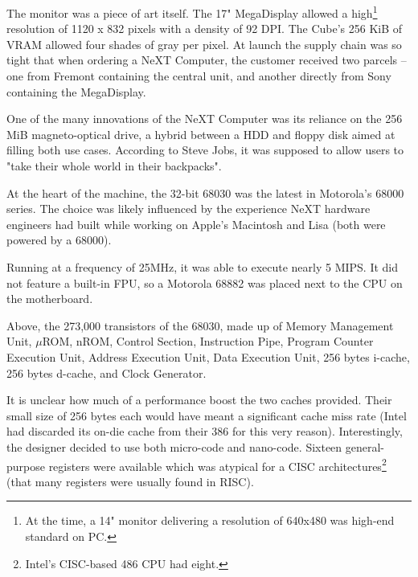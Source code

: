 The monitor was a piece of art itself. The 17" MegaDisplay allowed a high\footnote{At the time, a 14" monitor delivering a resolution of 640x480 was high-end standard on PC.} resolution of 1120 x 832 pixels with a density of 92 DPI. The Cube's 256 KiB of VRAM allowed four shades of gray per pixel. At launch the supply chain was so tight that when ordering a NeXT Computer, the customer received two parcels -- one from Fremont containing the central unit, and another directly from Sony containing the MegaDisplay.





\begin{figure}[H]
\centering
{}
\end{figure}
\par
One of the many innovations of the NeXT Computer was its reliance on the 256 MiB magneto-optical drive, a hybrid between a HDD and floppy disk aimed at filling both use cases. According to Steve Jobs, it was supposed to allow users to "take their whole world in their backpacks".\\
\par
At the heart of the machine, the 32-bit 68030 was the latest in Motorola's 68000 series. The choice was likely influenced by the experience NeXT hardware engineers had built while working on Apple's Macintosh and Lisa (both were powered by a 68000).\\
\par
 Running at a frequency of 25MHz, it was able to execute nearly 5 MIPS. It did not feature a built-in FPU, so a Motorola 68882 was placed next to the CPU on the motherboard. %



\begin{figure}[H]
\centering
{}
\end{figure}
\par
\vspace{-3mm}
Above, the 273,000 transistors of the 68030, made up of  Memory Management Unit,  $\mu$ROM,  nROM,  Control Section,  Instruction Pipe,  Program Counter Execution Unit,  Address Execution Unit,  Data Execution Unit,  256 bytes i-cache,  256 bytes d-cache, and  Clock Generator.\\         
\par
It is unclear how much of a performance boost the two caches provided. Their small size of 256 bytes each would have meant a significant cache miss rate (Intel had discarded its on-die cache from their 386 for this very reason). Interestingly, the designer decided to use both micro-code and nano-code. Sixteen general-purpose registers were available which was atypical for a CISC architectures\footnote{Intel's CISC-based 486 CPU had eight.} (that many registers were usually found in RISC).
 


